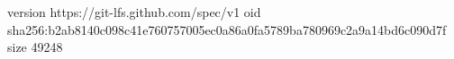 version https://git-lfs.github.com/spec/v1
oid sha256:b2ab8140c098c41e760757005ec0a86a0fa5789ba780969c2a9a14bd6c090d7f
size 49248
